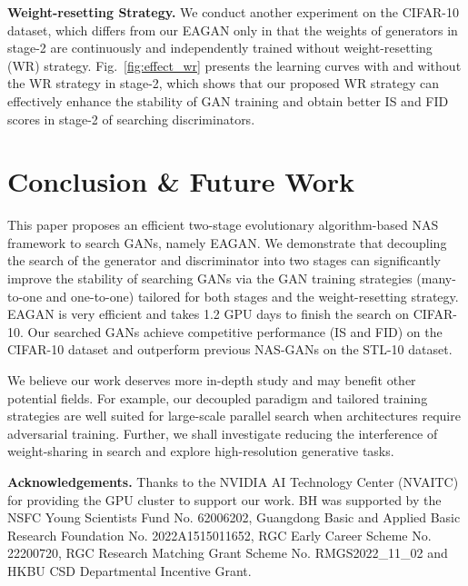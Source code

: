 \documentclass[runningheads]{llncs}
\begin{document}
\textbf{Weight-resetting Strategy.} We conduct another experiment on the CIFAR-10 dataset, which differs from our EAGAN only in that the weights of  generators in stage-2 are continuously and independently trained without weight-resetting (WR) strategy. Fig.~\ref{fig:effect_wr} presents the learning curves with and without the WR strategy in stage-2, which shows that our proposed WR strategy can effectively enhance the stability of GAN training and obtain better IS and FID scores in stage-2 of searching discriminators.






\section{Conclusion \&  Future Work}


This paper proposes an efficient two-stage evolutionary algorithm-based NAS framework to search GANs, namely EAGAN.  We demonstrate that decoupling the search of the generator and discriminator into two stages can significantly improve the stability of searching GANs via the GAN training strategies (many-to-one and one-to-one) tailored for both stages and the weight-resetting strategy. EAGAN is very efficient and takes 1.2 GPU days to finish the search on CIFAR-10. Our searched GANs achieve competitive performance (IS and FID) on the CIFAR-10 dataset and outperform previous NAS-GANs on the STL-10 dataset. 

We believe our work deserves more in-depth study and may benefit other potential fields. For example, our decoupled paradigm and tailored training strategies are well suited for large-scale parallel search when architectures require adversarial training. Further, we shall investigate reducing the interference of weight-sharing in search and explore high-resolution generative tasks.

\noindent\textbf{Acknowledgements.} Thanks to the NVIDIA AI Technology Center (NVAITC) for providing the GPU cluster to support our work. BH was supported by the NSFC Young Scientists Fund No. 62006202, Guangdong Basic and Applied Basic Research Foundation No. 2022A1515011652, RGC Early Career Scheme No. 22200720, RGC Research Matching Grant Scheme No. RMGS2022\_11\_02 and HKBU CSD Departmental Incentive Grant.










\end{document}
